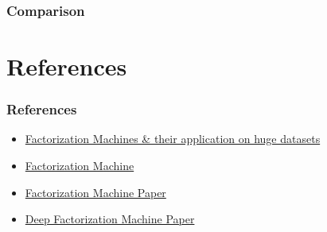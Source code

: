 \documentclass{beamer}
\begin{document}
\begin{frame}
	\frametitle{Comparison}
\end{frame}

\section{References}
\begin{frame}
	\frametitle{References}
	\begin{itemize}
		\item \href{https://www.analyticsvidhya.com/blog/2018/01/factorization-machines/}{Factorization Machines \& their application on huge datasets}
		\item \href{http://berwynzhang.com/2017/01/22/machine_learning/Factorization_Machines/}{Factorization Machine}		
		\item \href{https://www.csie.ntu.edu.tw/~b97053/paper/Rendle2010FM.pdf}{Factorization Machine Paper}
		\item \href{https://arxiv.org/pdf/1703.04247.pdf}{Deep Factorization Machine Paper}
	\end{itemize}
\end{frame}
\end{document}
